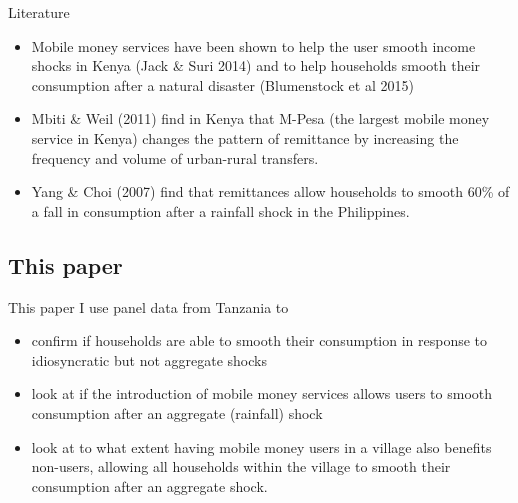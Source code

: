 \documentclass[t]{beamer}
\begin{document}
\begin{frame}{Literature}
\begin{itemize}
\item Mobile money services have been shown to help the user smooth income shocks in Kenya (Jack \& Suri 2014) and to help households smooth their consumption after a natural disaster (Blumenstock et al 2015) 
\item Mbiti \& Weil (2011) find in Kenya that M-Pesa (the largest mobile money service in Kenya) changes the pattern of remittance by increasing the frequency and volume of urban-rural transfers. 
\item Yang \& Choi (2007) find that remittances allow households to smooth 60\% of a fall in consumption after a rainfall shock in the Philippines.
\end{itemize}
\end{frame}


\subsection*{This paper}
\begin{frame}{This paper}
I use panel data from Tanzania to
\begin{itemize}
\item confirm if households are able to smooth their consumption in response to idiosyncratic but not aggregate shocks
\item look at if the introduction of mobile money services allows users to smooth consumption after an aggregate (rainfall) shock
\item look at to what extent having mobile money users in a village also benefits non-users, allowing all households within the village to smooth their consumption after an aggregate shock. 
\end{itemize}
\end{frame}
\end{document}

